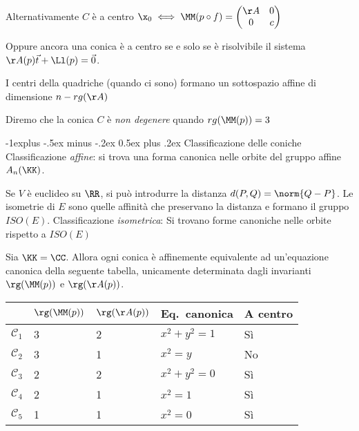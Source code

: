 \documentclass[10pt,landscape]{article}
\makeatletter
\renewcommand{\subsection}{\@startsection{subsection}{2}{0mm}%
	{-1explus -.5ex minus -.2ex}%
	{0.5ex plus .2ex}%
	{\normalfont\normalsize\bfseries}}
\makeatother
\begin{document}
\begin{multicols}{3}
            Alternativamente $C$ è a centro $\x_0 \iff \MM(p \circ f)=\begin{pmatrix}
                \AA & 0 \\
                0 & c
            \end{pmatrix}$
            
		Oppure ancora una conica è a centro se e solo se è risolvibile il sistema $\AA(p) \vec t + \Ll(p) = \vec 0$.

        I centri della quadriche (quando ci sono) formano un sottospazio affine di dimensione $n-rg(\AA)$

        Diremo che la conica $C$ è \textit{non degenere} quando $rg(\MM(p))=3$

        \subsection{Classificazione delle coniche}
        Classificazione \textit{affine}: si trova una forma canonica nelle orbite del gruppo affine $A_n(\KK)$.

        Se $V$ è euclideo su $\RR$, si può introdurre la distanza $d(P,Q)=\norm{Q-P}$.
        Le isometrie di $E$ sono quelle affinità che preservano la distanza e formano il gruppo $ISO(E)$.
        Classificazione \textit{isometrica}: Si trovano forme canoniche nelle orbite rispetto a $ISO(E)$ %

		Sia $\KK=\CC$. Allora ogni conica è affinemente equivalente ad
		un'equazione canonica della seguente tabella, unicamente
		determinata dagli invarianti $\rg(\MM(p))$ e $\rg(\AA(p))$.
		
		\begin{center}
			\tiny
			\begin{tabular}{|l|l|l|l|l|}
				\hline
				& $\rg(\MM(p))$ & $\rg(\AA(p))$ & Eq.~canonica & A centro \\ \hline
				$\mathcal{C}_1$ & 3             & 2             & $x^2+y^2=1$        & Sì       \\ \hline
				$\mathcal{C}_2$ & 3             & 1             & $x^2=y$            & No       \\ \hline
				$\mathcal{C}_3$ & 2             & 2             & $x^2+y^2=0$        & Sì       \\ \hline
				$\mathcal{C}_4$ & 2             & 1             & $x^2=1$          & Sì       \\ \hline
				$\mathcal{C}_5$ & 1             & 1             & $x^2=0$            & Sì       \\ \hline
			\end{tabular}
		\end{center}


\end{multicols}
\end{document}
